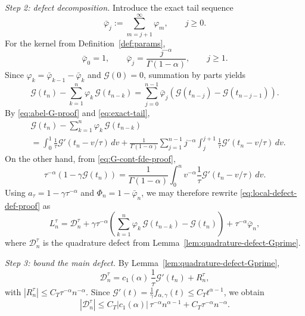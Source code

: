 \documentclass[letterpaper]{article}
\numberwithin{equation}{section}
\theoremstyle{definition}
\theoremstyle{remark}
\begin{document}
\medskip
\noindent
\textit{Step 2: defect decomposition.}
Introduce the exact tail sequence
\[
  \bar\varphi_j:=\sum_{m=j+1}^\infty \varphi_m,
  \qquad j\ge0.
\]
For the kernel from Definition~\ref{def:params},
\begin{equation}\label{eq:exact-tail}
  \bar\varphi_0=1,
  \qquad
  \bar\varphi_j=\frac{j^{-\alpha}}{\Gamma(1-\alpha)},
  \qquad j\ge1.
\end{equation}
Since $\varphi_k=\bar\varphi_{k-1}-\bar\varphi_k$ and $\mathcal G(0)=0$,
summation by parts yields
\begin{equation}\label{eq:abel-G-proof}
  \mathcal G(t_n)-\sum_{k=1}^n\varphi_k\,\mathcal G(t_{n-k})
  =
  \sum_{j=0}^{n-1}\bar\varphi_j
  \left(\mathcal G(t_{n-j})-\mathcal G(t_{n-j-1})\right).
\end{equation}
By \eqref{eq:abel-G-proof} and \eqref{eq:exact-tail},
\begin{align}
  &\mathcal G(t_n)-\sum_{k=1}^n\varphi_k\,\mathcal G(t_{n-k})
  \nonumber\\
  &=
  \int_0^1 \frac1\tau \mathcal G'(t_n-v/\tau)\,dv
  +
  \frac1{\Gamma(1-\alpha)}
  \sum_{j=1}^{n-1}
  j^{-\alpha}\int_j^{j+1}\frac1\tau\mathcal G'(t_n-v/\tau)\,dv.
  \label{eq:discrete-caputo-proof}
\end{align}
On the other hand, from \eqref{eq:G-cont-fde-proof},
\begin{equation}\label{eq:continuous-caputo-proof}
  \tau^{-\alpha}\left(1-\gamma\mathcal G(t_n)\right)
  =
  \frac1{\Gamma(1-\alpha)}
  \int_0^n v^{-\alpha}\frac1\tau\mathcal G'(t_n-v/\tau)\,dv.
\end{equation}
Using $a_\tau=1-\gamma\tau^{-\alpha}$ and $\Phi_n=1-\bar\varphi_n$, we may
therefore rewrite \eqref{eq:local-defect-def-proof} as
\begin{equation}\label{eq:Ln-split-proof}
  L_n^\tau
  =
  \mathcal D_n^\tau
  +
  \gamma\tau^{-\alpha}
  \left(
    \sum_{k=1}^n\varphi_k\,\mathcal G(t_{n-k})-\mathcal G(t_n)
  \right)
  +\tau^{-\alpha}\bar\varphi_n,
\end{equation}
where $\mathcal D_n^\tau$ is the quadrature defect from
Lemma~\ref{lem:quadrature-defect-Gprime}.

\medskip
\noindent
\textit{Step 3: bound the main defect.}
By Lemma~\ref{lem:quadrature-defect-Gprime},
\[
  \mathcal D_n^\tau
  =
  c_1(\alpha)\,\frac1\tau \mathcal G'(t_n)
  +R_n^\tau,
\]
with
$|R_n^\tau|\le C_T\tau^{-\alpha}n^{-\alpha}$.
Since
$\mathcal G'(t)=\frac1\gamma f_{\alpha,\gamma}(t)\le C_T t^{\alpha-1}$,
we obtain
\begin{equation}\label{eq:Ln-main-bound}
  |\mathcal D_n^\tau|
  \le
  C_T|c_1(\alpha)|\,\tau^{-\alpha}n^{\alpha-1}
  +C_T\tau^{-\alpha}n^{-\alpha}.
\end{equation}
\end{document}
